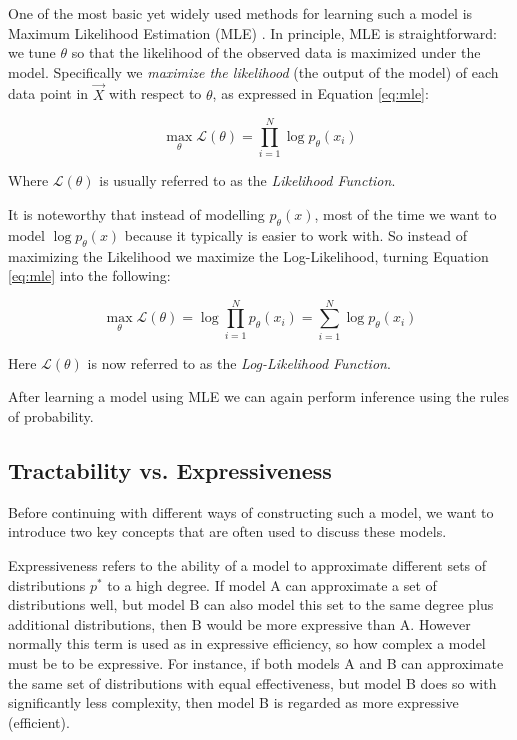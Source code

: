 One of the most basic yet widely used methods for learning such a model is Maximum Likelihood Estimation (MLE) \cite{ml_book}. 
In principle, MLE is straightforward: we tune $\theta$ so that the likelihood of the observed data is maximized under the model.
Specifically we \emph{maximize the likelihood} (the output of the model) of each data point in $\vec X$ with respect to $\theta$, as 
expressed in Equation \ref{eq:mle}: 

\begin{equation}
    \max_{\theta} \mathcal{L}(\theta) = \prod_{i=1}^{N} \log p_\theta(x_i)
    \label{eq:mle}
\end{equation}

Where $\mathcal{L}(\theta)$ is usually referred to as the \emph{Likelihood Function}.

It is noteworthy that instead of modelling $p_\theta(x)$, most of the time we want to model $\log p_\theta(x)$ because it typically is easier to work with. 
So instead of maximizing the Likelihood we maximize the Log-Likelihood, turning Equation \ref{eq:mle} into the following:

\begin{equation}
    \max_{\theta} \mathcal{L}(\theta) = \log \prod_{i=1}^{N} p_\theta(x_i) = \sum_{i=1}^{N} \log p_\theta(x_i)
    \label{eq:log_mle}
\end{equation}

Here $\mathcal{L}(\theta)$ is now referred to as the \emph{Log-Likelihood Function}. 

After learning a model using MLE we can again perform inference using the rules of probability. 

\subsection{Tractability vs. Expressiveness}

Before continuing with different ways of constructing such a model, we want to introduce two key concepts that are often 
used to discuss these models. 

\begin{definition} [Expressiveness]
    Expressiveness refers to the ability of a model to approximate different sets of distributions $p^*$ to a high degree. If model A can approximate a set of 
    distributions well, but model B can also model this set to the same degree plus additional distributions, then B would be more expressive than A.
    However normally this term is used as in expressive efficiency, so how complex a model must be to be expressive.  For instance, if both models A and B can approximate the same set of distributions with equal effectiveness, but model B does so with significantly less complexity, then model B is regarded as more expressive (efficient).  \cite{pc_intro}
\end{definition}

